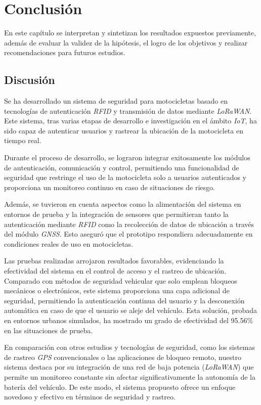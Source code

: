 \fancyhead{}
\fancyfoot{}
\pagestyle{plain}


\chapter{Conclusión}

En este capítulo se interpretan y sintetizan los resultados expuestos previamente, además de evaluar la validez de la hipótesis, el logro de los objetivos y realizar recomendaciones para futuros estudios.\\ 

\section{Discusión}
Se ha desarrollado un sistema de seguridad para motocicletas basado en tecnologías de autenticación \textit{RFID} y transmisión de datos mediante \textit{LoRaWAN}. Este sistema, tras varias etapas de desarrollo e investigación en el ámbito \textit{IoT}, ha sido capaz de autenticar usuarios y rastrear la ubicación de la motocicleta en tiempo real.

Durante el proceso de desarrollo, se lograron integrar exitosamente los módulos de autenticación, comunicación y control, permitiendo una funcionalidad de seguridad que restringe el uso de la motocicleta solo a usuarios autenticados y proporciona un monitoreo continuo en caso de situaciones de riesgo.

Además, se tuvieron en cuenta aspectos como la alimentación del sistema en entornos de prueba y la integración de sensores que permitieran tanto la autenticación mediante \textit{RFID} como la recolección de datos de ubicación a través del módulo \textit{GNSS}. Esto aseguró que el prototipo respondiera adecuadamente en condiciones reales de uso en motocicletas.

Las pruebas realizadas arrojaron resultados favorables, evidenciando la efectividad del sistema en el control de acceso y el rastreo de ubicación. Comparado con métodos de seguridad vehicular que solo emplean bloqueos mecánicos o electrónicos, este sistema proporciona una capa adicional de seguridad, permitiendo la autenticación continua del usuario y la desconexión automática en caso de que el usuario se aleje del vehículo. Esta solución, probada en entornos urbanos simulados, ha mostrado un grado de efectividad del 95.56\% en las situaciones de prueba.

En comparación con otros estudios y tecnologías de seguridad, como los sistemas de rastreo \textit{GPS} convencionales o las aplicaciones de bloqueo remoto, nuestro sistema destaca por su integración de una red de baja potencia (\textit{LoRaWAN}) que permite un monitoreo constante sin afectar significativamente la autonomía de la batería del vehículo. De este modo, el sistema propuesto ofrece un enfoque novedoso y efectivo en términos de seguridad y rastreo.

